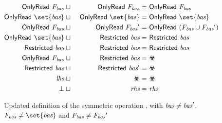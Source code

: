 \begin{figure}[H]
\begin{alignat*}{3}
    \onlyread{\Basesfamvar}     & \joinsym \ & \onlyread{\Basesfamvar}   = \    & \onlyread{\Basesfamvar}  \\
    \onlyread{\set{\Basesvar}}     & \joinsym \ & \onlyread{\set{\Basesvar}}   = \  & \onlyread{\set{\Basesvar}} \\
    \onlyread{\Basesfamvar}     & \joinsym \ & \onlyread{\Basesfamvar'}  = \    & \onlyread{(\Basesfamvar \cup \Basesfamvar')}  \\
    \onlyread{\set{\Basesvar}}  & \joinsym \ & \restricted{\Basesvar} = \       & \restricted{\Basesvar} \\
    \restricted{\Basesvar}      & \joinsym \ & \restricted{\Basesvar} = \       & \restricted{\Basesvar} \\
    \onlyread{\Basesfamvar}     & \joinsym \ & \restricted{\Basesvar} = \      & \rsub \\
    \restricted{\Basesvar}      & \joinsym \ & \restricted{\Basesvar'} = \      & \rsub \\
    \textit{lhs}                & \joinsym \ & \rsub        = \                 & \rsub \\
    \bot                        & \joinsym \ & \textit{rhs}    = \              & \textit{rhs}
\end{alignat*}
\caption{Updated definition of the symmetric operation \joinsym, with $\textit{bas} \neq \textit{bas}'$, $\Basesfamvar \neq \set{\Basesvar}$ and $\textit{F}\textsubscript{\textit{bas}} \neq \textit{F}\textsubscript{\textit{bas}}'$}
\label{figure:updated-definition-of-join}
\end{figure}
